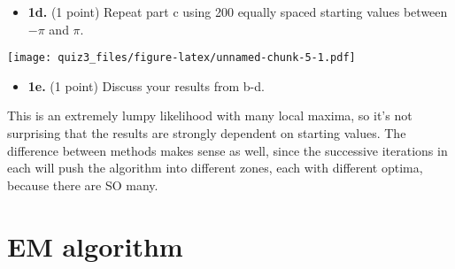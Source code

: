 \documentclass[
]{article}
\newenvironment{Shaded}{\begin{snugshade}}{\end{snugshade}}
\newcommand{\AttributeTok}[1]{\textcolor[rgb]{0.77,0.63,0.00}{#1}}
\newcommand{\DecValTok}[1]{\textcolor[rgb]{0.00,0.00,0.81}{#1}}
\newcommand{\FunctionTok}[1]{\textcolor[rgb]{0.00,0.00,0.00}{#1}}
\newcommand{\NormalTok}[1]{#1}
\newcommand{\SpecialCharTok}[1]{\textcolor[rgb]{0.00,0.00,0.00}{#1}}
\providecommand{\tightlist}{%
  \setlength{\itemsep}{0pt}\setlength{\parskip}{0pt}}
\begin{document}
\begin{itemize}
\tightlist
\item
  \textbf{1d.} (1 point) Repeat part c using 200 equally spaced starting
  values between \(-\pi\) and \(\pi\).
\end{itemize}

\begin{Shaded}
\end{Shaded}

\texttt{[image: quiz3\_files/figure-latex/unnamed-chunk-5-1.pdf]}

\begin{itemize}
\tightlist
\item
  \textbf{1e.} (1 point) Discuss your results from b-d.
\end{itemize}

This is an extremely lumpy likelihood with many local maxima, so it's
not surprising that the results are strongly dependent on starting
values. The difference between methods makes sense as well, since the
successive iterations in each will push the algorithm into different
zones, each with different optima, because there are SO many.

\hypertarget{em-algorithm}{%
\section{EM algorithm}\label{em-algorithm}}
\end{document}
